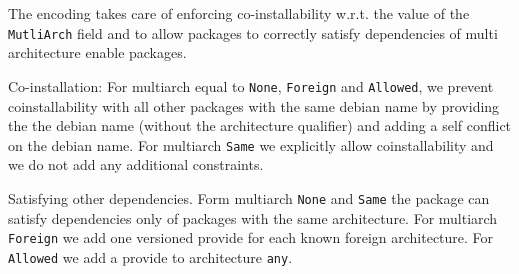 The encoding takes care of enforcing co-installability w.r.t. the value of the 
\texttt{MutliArch} field and to allow packages to correctly satisfy dependencies of
multi architecture enable packages.


\par{Co-installation}: For multiarch equal to \texttt{None}, \texttt{Foreign}
and \texttt{Allowed}, we prevent coinstallability with all other packages with
the same debian name by providing the the debian name (without the architecture
qualifier) and adding a self conflict on the debian name. For multiarch
\texttt{Same} we explicitly allow coinstallability and we do not add any
additional constraints.

\par{Satisfying other dependencies}. Form multiarch \texttt{None} and
\texttt{Same} the package can satisfy dependencies only of packages with the
same architecture. For multiarch \texttt{Foreign} we add one versioned provide
for each known foreign architecture. For \texttt{Allowed} we add a provide to
architecture \texttt{any}.
